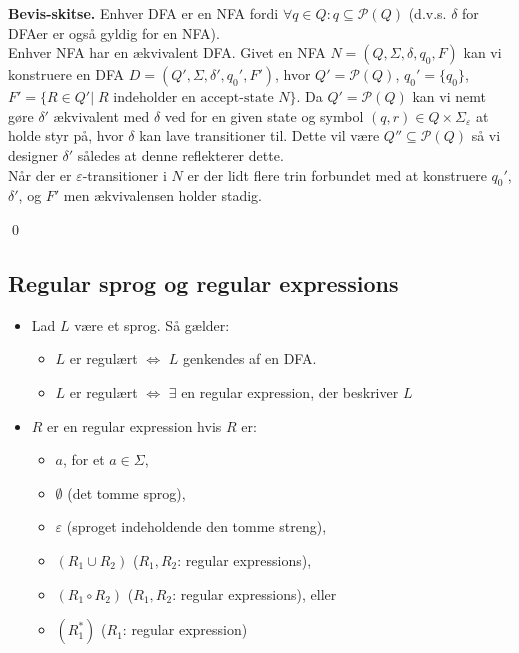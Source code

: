 \textbf{Bevis-skitse.} Enhver DFA er en NFA fordi $\forall q \in Q: q \subseteq \mathcal{P}(Q)$ (d.v.s. $\delta$ for DFAer er også gyldig for en NFA). \\

Enhver NFA har en ækvivalent DFA. Givet en NFA $N=(Q,\Sigma,\delta,q_0,F)$ kan vi konstruere en DFA $D=(Q', \Sigma, \delta',q_0',F')$, hvor $Q'=\mathcal{P}(Q)$, $q_0'=\{q_0\}$, $F'=\{R \in Q' | \; R \text{ indeholder en accept-state } N\}$. Da $Q'=\mathcal{P}(Q)$ kan vi nemt gøre $\delta'$ ækvivalent med $\delta$ ved for en given state og symbol $(q,r) \in Q \times \Sigma_{\varepsilon}$ at holde styr på, hvor $\delta$ kan lave transitioner til. Dette vil være $Q'' \subseteq \mathcal{P}(Q)$ så vi designer $\delta'$ således at denne reflekterer dette. \\

Når der er $\varepsilon$-transitioner i $N$ er der lidt flere trin forbundet med at konstruere $q_0'$, $\delta'$, og $F'$ men ækvivalensen holder stadig.
\begin{flushright}
    \qed 
\end{flushright}

\subsection*{Regular sprog og regular expressions}

\begin{itemize}
    \item Lad $L$ være et sprog. Så gælder: 
    \begin{itemize}
    	\item $L$ er regulært $\Leftrightarrow$ $L$ genkendes af en DFA.
    	\item $L$ er regulært $\Leftrightarrow$ $\exists$ en regular expression, der beskriver $L$
    \end{itemize}
    
    \item $R$ er en regular expression hvis $R$ er:
    \begin{itemize}
        \item $a$, for et $a \in \Sigma$,
        \item $\emptyset$ (det tomme sprog),
        \item $\varepsilon$ (sproget indeholdende den tomme streng), 
        \item $(R_1 \cup R_2)$ ($R_1,R_2$: regular expressions),
        \item $(R_1 \circ R_2)$ ($R_1,R_2$: regular expressions), eller 
        \item $(R_1^*)$ ($R_1$: regular expression)
    \end{itemize}
\end{itemize}

